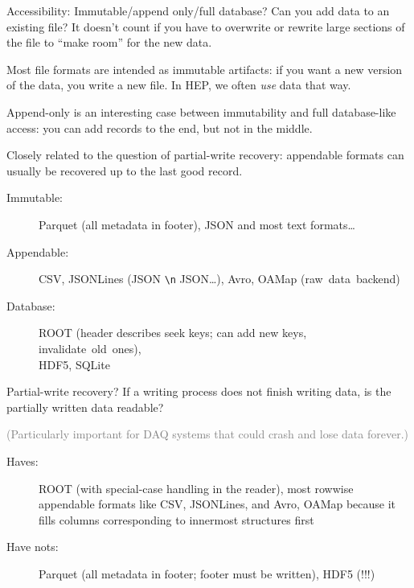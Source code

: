 \documentclass[aspectratio=169]{beamer}
\begin{document}
\begin{frame}{Accessibility: Immutable/append only/full database?}
\vspace{0.5 cm}
Can you add data to an existing file? It doesn't count if you have to overwrite or rewrite large sections of the file to ``make room'' for the new data.

\vspace{0.35 cm}

Most file formats are intended as immutable artifacts: if you want a new version of the data, you write a new file. In HEP, we often {\it use} data that way.

\vspace{0.35 cm}

Append-only is an interesting case between immutability and full database-like access: you can add records to the end, but not in the middle.

\vspace{0.35 cm}

Closely related to the question of partial-write recovery: appendable formats can usually be recovered up to the last good record.

\vspace{0.15 cm}

\begin{description}
\item[Immutable:] Parquet (all metadata in footer), JSON and most text formats\ldots
\item[Appendable:] CSV, JSONLines (JSON {\tt\small \textbackslash n} JSON\ldots), Avro, OAMap \mbox{(raw data backend)\hspace{-1 cm}}
\item[Database:] ROOT (header describes seek keys; can add new keys, \mbox{invalidate old ones),\hspace{-1 cm}} \\ HDF5, SQLite
\end{description}
\end{frame}

\begin{frame}{Partial-write recovery?}
If a writing process does not finish writing data, is the partially written data readable?

\vspace{0.2 cm}
\textcolor{gray}{(Particularly important for DAQ systems that could crash and lose data forever.)}

\vfill

\begin{description}
\item[Haves:] ROOT (with special-case handling in the reader), most rowwise appendable formats like CSV, JSONLines, and Avro, OAMap because it fills columns corresponding to innermost structures first
\item[Have nots:] Parquet (all metadata in footer; footer must be written), HDF5 (!!!)
\end{description}
\end{frame}
\end{document}
